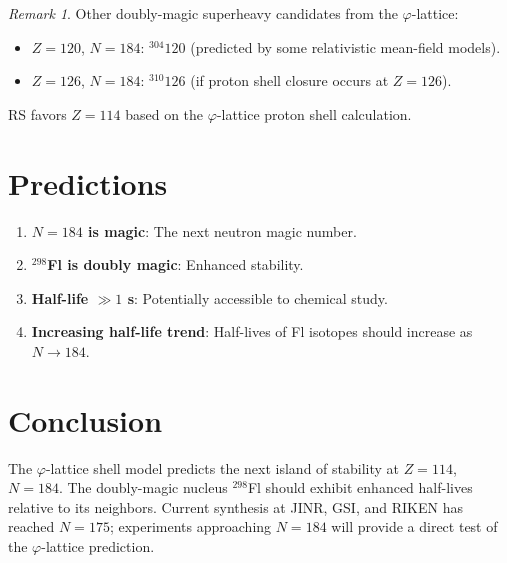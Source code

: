 \documentclass[12pt,a4paper]{article}
\theoremstyle{definition}
\theoremstyle{remark}
\newtheorem{remark}[theorem]{Remark}
\begin{document}
\begin{remark}
Other doubly-magic superheavy candidates from the $\varphi$-lattice:
\begin{itemize}
  \item $Z = 120$, $N = 184$: ${}^{304}120$ (predicted by some
  relativistic mean-field models).
  \item $Z = 126$, $N = 184$: ${}^{310}126$ (if proton shell
  closure occurs at $Z = 126$).
\end{itemize}
RS favors $Z = 114$ based on the $\varphi$-lattice proton shell
calculation.
\end{remark}

\section{Predictions}
\label{sec:predictions}

\begin{enumerate}
  \item \textbf{$N = 184$ is magic}: The next neutron magic number.

  \item \textbf{${}^{298}$Fl is doubly magic}: Enhanced stability.

  \item \textbf{Half-life $\gg 1$ s}: Potentially accessible to
  chemical study.

  \item \textbf{Increasing half-life trend}: Half-lives of Fl
  isotopes should increase as $N \to 184$.
\end{enumerate}

\section{Conclusion}
\label{sec:conclusion}

The $\varphi$-lattice shell model predicts the next island of
stability at $Z = 114$, $N = 184$.  The doubly-magic nucleus
${}^{298}$Fl should exhibit enhanced half-lives relative to its
neighbors.  Current synthesis at JINR, GSI, and RIKEN has reached
$N = 175$; experiments approaching $N = 184$ will provide a direct
test of the $\varphi$-lattice prediction.
\end{document}
